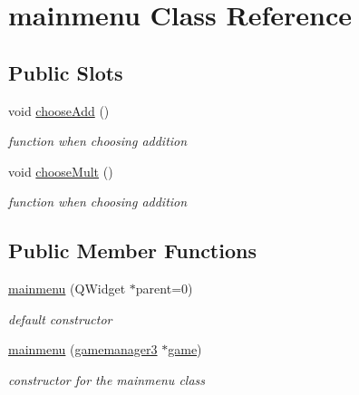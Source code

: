 \hypertarget{classmainmenu}{\section{mainmenu \-Class \-Reference}
\label{classmainmenu}
}
\subsection*{\-Public \-Slots}
\begin{DoxyCompactItemize}
\item 
void \hyperlink{classmainmenu_a3637e219cb0b49a98347733ec5ab6013}{choose\-Add} ()
\begin{DoxyCompactList}\small\item\em function when choosing addition \end{DoxyCompactList}\item 
void \hyperlink{classmainmenu_a6700d452d062a301a021180d9e3a11d2}{choose\-Mult} ()
\begin{DoxyCompactList}\small\item\em function when choosing addition \end{DoxyCompactList}\end{DoxyCompactItemize}
\subsection*{\-Public \-Member \-Functions}
\begin{DoxyCompactItemize}
\item 
\hypertarget{classmainmenu_acb09eb31e85e22931f64dba89019bc4d}{\hyperlink{classmainmenu_acb09eb31e85e22931f64dba89019bc4d}{mainmenu} (\-Q\-Widget $\ast$parent=0)}\label{classmainmenu_acb09eb31e85e22931f64dba89019bc4d}

\begin{DoxyCompactList}\small\item\em default constructor \end{DoxyCompactList}\item 
\hyperlink{classmainmenu_ab70b0c1295472f949fd5f80c64edacc7}{mainmenu} (\hyperlink{classgamemanager3}{gamemanager3} $\ast$\hyperlink{classmainmenu_a32ec24f59a4ea2f8b18218773a6740ef}{game})
\begin{DoxyCompactList}\small\item\em constructor for the mainmenu class \end{DoxyCompactList}\end{DoxyCompactItemize}
